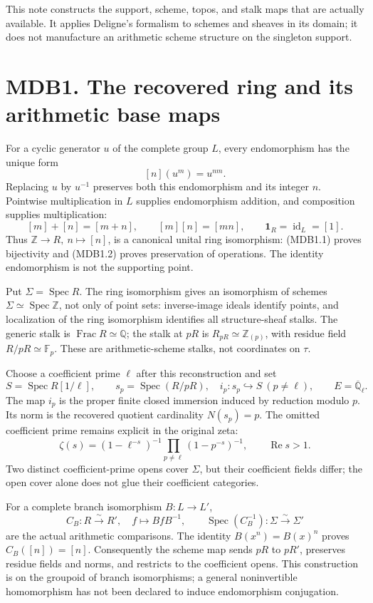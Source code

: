 \documentclass[
]{report}
\begin{document}
This note constructs the support, scheme, topos, and stalk maps that are
actually available. It applies Deligne's formalism to schemes and
sheaves in its domain; it does not manufacture an arithmetic scheme
structure on the singleton support.

\section{MDB1. The recovered ring and its arithmetic base
maps}\label{mdb1.-the-recovered-ring-and-its-arithmetic-base-maps}

For a cyclic generator \(u\) of the complete group \(L\), every
endomorphism has the unique form \[
[n](u^m)=u^{nm}.
\tag{MDB1.1}
\] Replacing \(u\) by \(u^{-1}\) preserves both this endomorphism and
its integer \(n\). Pointwise multiplication in \(L\) supplies
endomorphism addition, and composition supplies multiplication: \[
[m]+[n]=[m+n],\qquad [m][n]=[mn],\qquad
\mathbf1_R=\operatorname{id}_L=[1].
\tag{MDB1.2}
\] Thus \(\mathbb Z\to R,\ n\mapsto[n]\), is a canonical unital ring
isomorphism: (MDB1.1) proves bijectivity and (MDB1.2) proves
preservation of operations. The identity endomorphism is not the
supporting point.

Put \(\Sigma=\operatorname{Spec}R\). The ring isomorphism gives an
isomorphism of schemes \(\Sigma\simeq\operatorname{Spec}\mathbb Z\), not
only of point sets: inverse-image ideals identify points, and
localization of the ring isomorphism identifies all structure-sheaf
stalks. The generic stalk is \(\operatorname{Frac}R\simeq\mathbb Q\);
the stalk at \(pR\) is \(R_{pR}\simeq\mathbb Z_{(p)}\), with residue
field \(R/pR\simeq\mathbb F_p\). These are arithmetic-scheme stalks, not
coordinates on \(\tau\).

Choose a coefficient prime \(\ell\) after this reconstruction and set \[
S=\operatorname{Spec}R[1/\ell],\qquad
s_p=\operatorname{Spec}(R/pR),\quad
i_p:s_p\hookrightarrow S\ (p\neq\ell),\qquad E=\overline{\mathbb Q}_\ell.
\tag{MDB1.3}
\] The map \(i_p\) is the proper finite closed immersion induced by
reduction modulo \(p\). Its norm is the recovered quotient cardinality
\(N(s_p)=p\). The omitted coefficient prime remains explicit in the
original zeta: \[
\zeta(s)=(1-\ell^{-s})^{-1}\prod_{p\neq\ell}(1-p^{-s})^{-1},
\qquad \operatorname{Re}s>1.
\tag{MDB1.4}
\] Two distinct coefficient-prime opens cover \(\Sigma\), but their
coefficient fields differ; the open cover alone does not glue their
coefficient categories.

For a complete branch isomorphism \(B:L\to L'\), \[
C_B:R\xrightarrow{\sim}R',\quad f\mapsto BfB^{-1},
\qquad
\operatorname{Spec}(C_B^{-1}):\Sigma\xrightarrow{\sim}\Sigma'
\tag{MDB1.5}
\] are the actual arithmetic comparisons. The identity \(B(x^n)=B(x)^n\)
proves \(C_B([n])=[n]\). Consequently the scheme map sends \(pR\) to
\(pR'\), preserves residue fields and norms, and restricts to the
coefficient opens. This construction is on the groupoid of branch
isomorphisms; a general noninvertible homomorphism has not been declared
to induce endomorphism conjugation.
\end{document}
